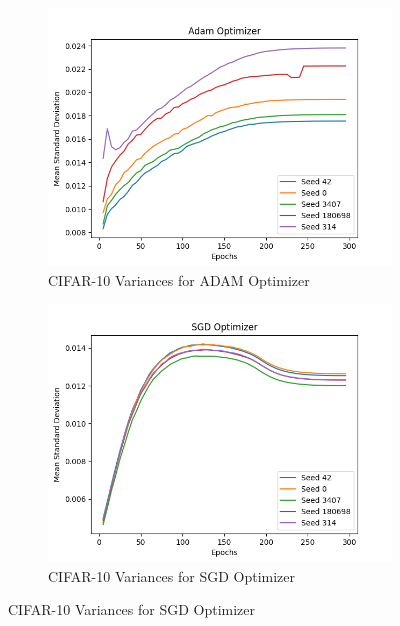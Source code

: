 \begin{figure}[h!]
      \centering
      
      \begin{subfigure}[b]{0.45\textwidth}
        \includegraphics[width=\textwidth]{figures/cifar_adam_curves_std.png}
        \caption{CIFAR-10 Variances for ADAM Optimizer}
        \label{fig:cifar10_adam}
      \end{subfigure}
      \hfill
      \begin{subfigure}[b]{0.45\textwidth}
        \includegraphics[width=\textwidth]{figures/cifar_sgd_curves_std.png}
        \caption{CIFAR-10 Variances for SGD Optimizer}
        \label{fig:cifar10_sgd}
      \end{subfigure}
      

\end{figure}
